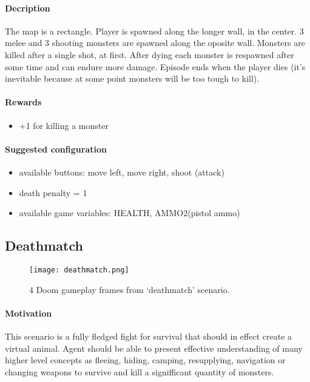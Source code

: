 		\paragraph{Decription}
			The map is a rectangle. Player is spawned along the longer wall, in the center. 3 melee and 3 shooting monsters are spawned along the oposite wall. Monsters are killed after a single shot, at first. After dying each monster is respawned after some time and can endure more damage. Episode ends when the player dies (it's inevitable because at some point monsters will be too tough to kill).
		\paragraph{Rewards}
			\begin{itemize}
				\item +1 for killing a monster
			\end{itemize}

		\paragraph{Suggested configuration}
			\begin{itemize}
				\item available buttons: move left, move right, shoot (attack)
				\item death penalty = 1
				\item available game variables: HEALTH, AMMO2(pistol ammo)
			\end{itemize}
	\newpage

	\subsection{Deathmatch}
		\begin{figure}
			\centering
			\texttt{[image: deathmatch.png]}
			\caption{4 Doom gameplay frames from `deathmatch' scenario.}\label{fig:deatchmatch}
		\end{figure}
		\paragraph{Motivation} 
	 		This scenario is a fully fledged fight for survival that should in effect create a virtual animal. Agent should be able to present effective understanding of many higher level concepts as fleeing, hiding, camping, resupplying, navigation or changing weapons to survive and kill a signifficant quantity of monsters.

